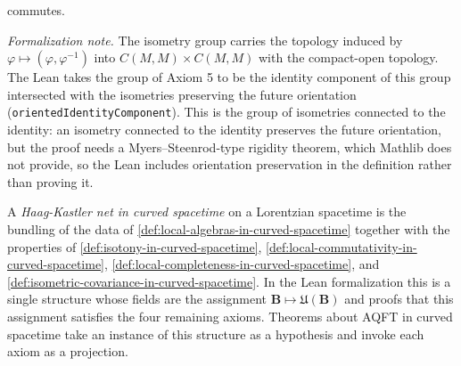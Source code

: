 \begin{definition}
    commutes.

    \emph{Formalization note.} The isometry group carries the topology induced by $\varphi \mapsto (\varphi, \varphi^{-1})$ into $C(M,M) \times C(M,M)$ with the compact-open topology. The Lean takes the group of Axiom 5 to be the identity component of this group intersected with the isometries preserving the future orientation (\texttt{orientedIdentityComponent}). This is the group of isometries connected to the identity: an isometry connected to the identity preserves the future orientation, but the proof needs a Myers--Steenrod-type rigidity theorem, which Mathlib does not provide, so the Lean includes orientation preservation in the definition rather than proving it.
\end{definition}

\begin{definition}
    \label{def:haag-kastler-net-in-curved-spacetime}
    \leanok
    A \emph{Haag-Kastler net in curved spacetime} on a Lorentzian spacetime is the bundling of the data of \ref{def:local-algebras-in-curved-spacetime} together with the properties of \ref{def:isotony-in-curved-spacetime}, \ref{def:local-commutativity-in-curved-spacetime}, \ref{def:local-completeness-in-curved-spacetime}, and \ref{def:isometric-covariance-in-curved-spacetime}. In the Lean formalization this is a single structure whose fields are the assignment $\mathbf{B} \mapsto \mathfrak{U}(\mathbf{B})$ and proofs that this assignment satisfies the four remaining axioms. Theorems about AQFT in curved spacetime take an instance of this structure as a hypothesis and invoke each axiom as a projection.
\end{definition}


